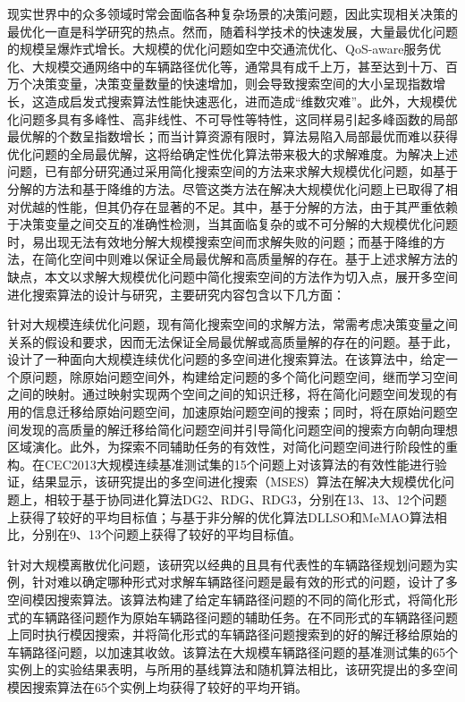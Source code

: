 \begin{cabstract}	%
现实世界中的众多领域时常会面临各种复杂场景的决策问题，因此实现相关决策的最优化一直是科学研究的热点。然而，随着科学技术的快速发展，大量最优化问题的规模呈爆炸式增长。大规模的优化问题如空中交通流优化、QoS-aware服务优化、大规模交通网络中的车辆路径优化等，通常具有成千上万，甚至达到十万、百万个决策变量，决策变量数量的快速增加，则会导致搜索空间的大小呈现指数增长，这造成启发式搜索算法性能快速恶化，进而造成“维数灾难”。此外，大规模优化问题多具有多峰性、高非线性、不可导性等特性，这同样易引起多峰函数的局部最优解的个数呈指数增长；而当计算资源有限时，算法易陷入局部最优而难以获得优化问题的全局最优解，这将给确定性优化算法带来极大的求解难度。为解决上述问题，已有部分研究通过采用简化搜索空间的方法来求解大规模优化问题，如基于分解的方法和基于降维的方法。尽管这类方法在解决大规模优化问题上已取得了相对优越的性能，但其仍存在显著的不足。其中，基于分解的方法，由于其严重依赖于决策变量之间交互的准确性检测，当其面临复杂的或不可分解的大规模优化问题时，易出现无法有效地分解大规模搜索空间而求解失败的问题；而基于降维的方法，在简化空间中则难以保证全局最优解和高质量解的存在。基于上述求解方法的缺点，本文以求解大规模优化问题中简化搜索空间的方法作为切入点，展开多空间进化搜索算法的设计与研究，主要研究内容包含以下几方面：

 针对大规模连续优化问题，现有简化搜索空间的求解方法，常需考虑决策变量之间关系的假设和要求，因而无法保证全局最优解或高质量解的存在的问题。基于此，设计了一种面向大规模连续优化问题的多空间进化搜索算法。在该算法中，给定一个原问题，除原始问题空间外，构建给定问题的多个简化问题空间，继而学习空间之间的映射。通过映射实现两个空间之间的知识迁移，将在简化问题空间发现的有用的信息迁移给原始问题空间，加速原始问题空间的搜索；同时，将在原始问题空间发现的高质量的解迁移给简化问题空间并引导简化问题空间的搜索方向朝向理想区域演化。此外，为探索不同辅助任务的有效性，对简化问题空间进行阶段性的重构。在CEC2013大规模连续基准测试集的15个问题上对该算法的有效性能进行验证，结果显示，该研究提出的多空间进化搜索（MSES）算法在解决大规模优化问题上，相较于基于协同进化算法DG2、RDG、RDG3，分别在13、13、12个问题上获得了较好的平均目标值；与基于非分解的优化算法DLLSO和MeMAO算法相比，分别在9、13个问题上获得了较好的平均目标值。

 针对大规模离散优化问题，该研究以经典的且具有代表性的车辆路径规划问题为实例，针对难以确定哪种形式对求解车辆路径问题是最有效的形式的问题，设计了多空间模因搜索算法。该算法构建了给定车辆路径问题的不同的简化形式，将简化形式的车辆路径问题作为原始车辆路径问题的辅助任务。在不同形式的车辆路径问题上同时执行模因搜索，并将简化形式的车辆路径问题搜索到的好的解迁移给原始的车辆路径问题，以加速其收敛。该算法在大规模车辆路径问题的基准测试集的65个实例上的实验结果表明，与所用的基线算法和随机算法相比，该研究提出的多空间模因搜索算法在65个实例上均获得了较好的平均开销。


\end{cabstract}
